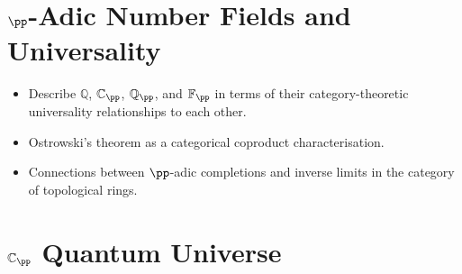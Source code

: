 
\section{\texorpdfstring{$\pp$}{p}-Adic Number Fields and Universality}
\label{sec:p-adic-fields}

\begin{itemize}
  \item Describe $\mathbb{Q}$, $\mathbb{C}_\pp$, $\mathbb{Q}_\pp$, and
        $\mathbb{F}_\pp$ in terms of their category-theoretic universality
        relationships to each other.
  \item Ostrowski's theorem as a categorical coproduct characterisation.
  \item Connections between $\pp$-adic completions and inverse limits in
        the category of topological rings.
\end{itemize}


\section{\texorpdfstring{$\mathbb{C}_\pp$}{C\_p} Quantum Universe}
\label{sec:cp-que}

